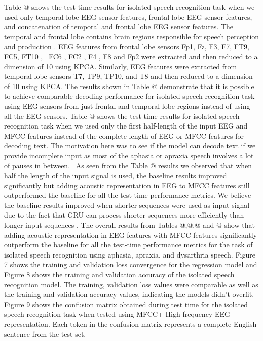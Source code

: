 \documentclass[letterpaper, 10 pt, conference]{ieeeconf}  %
\makeatletter
\newcommand*{\rom}[1]{\expandafter\@slowromancap\romannumeral #1@}
\makeatother
\begin{document}
Table \rom{5} shows the test time results for isolated speech recognition task when we used only temporal lobe EEG sensor features, frontal lobe EEG sensor features, and concatenation of temporal and frontal lobe EEG sensor features. The temporal and frontal lobe contains brain regions responsible for speech perception and production \cite{flinker2015redefining,chartier2018encoding}. EEG features from frontal lobe sensors Fp1, Fz, F3, F7, FT9, FC5, FT10 ,  FC6 , FC2 , F4 , F8 and Fp2 were extracted and then reduced to a dimension of 10 using KPCA. Similarly, EEG features were extracted from temporal lobe sensors T7, TP9, TP10, and T8 and then reduced to a dimension of 10 using KPCA. The results shown in Table \rom{5} demonstrate that it is possible to achieve comparable decoding performance for isolated speech recognition task using EEG sensors from just frontal and temporal lobe regions instead of using all the EEG sensors. Table \rom{6} shows the test time results for isolated speech recognition task when we used only the first half-length of the input EEG and MFCC features instead of the complete length of EEG or MFCC features for decoding text. The motivation here was to see if the model can decode text if we provide incomplete input as most of the aphasia or apraxia speech involves a lot of pauses in between.  As seen from the Table \rom{6} results we observed that when half the length of the input signal is used, the baseline results improved significantly but adding acoustic representation in EEG to MFCC features still outperformed the baseline for all the test-time performance metrics. We believe the baseline results improved when shorter sequences were used as input signal due to the fact that GRU can process shorter sequences more efficiently than longer input sequences \cite{chung2014empirical,bai2018empirical}. The overall results from Tables \rom{2},\rom{3},\rom{5} and \rom{6} show that adding acoustic representation in EEG features with MFCC features significantly outperform the baseline for all the test-time performance metrics for the task of isolated speech recognition using aphasia, apraxia, and dysarthria speech. Figure 7 shows the training and validation loss convergence for the regression model and Figure 8 shows the training and validation accuracy of the isolated speech recognition model. The training, validation loss values were comparable as well as the training and validation accuracy values, indicating the models didn't overfit. Figure 9 shows the confusion matrix obtained during test time for the isolated speech recognition task when tested using MFCC+ High-frequency EEG representation. Each token in the confusion matrix represents a complete English sentence from the test set. 
\end{document}

